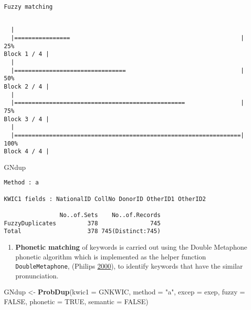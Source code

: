 \documentclass[]{article}
\newenvironment{Shaded}{\begin{snugshade}}{\end{snugshade}}
\newcommand{\DataTypeTok}[1]{\textcolor[rgb]{0.13,0.29,0.53}{#1}}
\newcommand{\KeywordTok}[1]{\textcolor[rgb]{0.13,0.29,0.53}{\textbf{#1}}}
\newcommand{\NormalTok}[1]{#1}
\newcommand{\OtherTok}[1]{\textcolor[rgb]{0.56,0.35,0.01}{#1}}
\newcommand{\StringTok}[1]{\textcolor[rgb]{0.31,0.60,0.02}{#1}}
\providecommand{\tightlist}{%
  \setlength{\itemsep}{0pt}\setlength{\parskip}{0pt}}
\begin{document}
\begin{verbatim}
Fuzzy matching
\end{verbatim}

\begin{verbatim}

  |                                                                       
  |================                                                 |  25%
Block 1 / 4 |
  |                                                                       
  |================================                                 |  50%
Block 2 / 4 |
  |                                                                       
  |=================================================                |  75%
Block 3 / 4 |
  |                                                                       
  |=================================================================| 100%
Block 4 / 4 |
\end{verbatim}

\begin{Shaded}
\begin{Highlighting}[]
\NormalTok{GNdup}
\end{Highlighting}
\end{Shaded}

\begin{verbatim}
Method : a

KWIC1 fields : NationalID CollNo DonorID OtherID1 OtherID2
 
                No..of.Sets    No..of.Records
FuzzyDuplicates         378               745
Total                   378 745(Distinct:745)
\end{verbatim}

\begin{enumerate}
\def\labelenumi{\arabic{enumi}.}
\setcounter{enumi}{1}
\tightlist
\item
  \textbf{Phonetic matching} of keywords is carried out using the Double
  Metaphone phonetic algorithm which is implemented as the helper
  function \texttt{DoubleMetaphone}, (Philips
  \protect\hyperlink{ref-p00}{2000}), to identify keywords that have the
  similar pronunciation.
\end{enumerate}

\begin{Shaded}
\begin{Highlighting}[]
\NormalTok{GNdup <-}\StringTok{ }\KeywordTok{ProbDup}\NormalTok{(}\DataTypeTok{kwic1 =}\NormalTok{ GNKWIC, }\DataTypeTok{method =} \StringTok{"a"}\NormalTok{, }\DataTypeTok{excep =}\NormalTok{ exep, }
                 \DataTypeTok{fuzzy =} \OtherTok{FALSE}\NormalTok{,}
                 \DataTypeTok{phonetic =} \OtherTok{TRUE}\NormalTok{,}
                 \DataTypeTok{semantic =} \OtherTok{FALSE}\NormalTok{)}
\end{Highlighting}
\end{Shaded}
\end{document}
